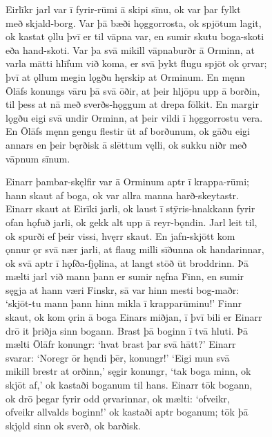 \documentclass[12pt,letterpaper]{book}
\begin{document}
\begin{linenumbers}
Eirlīkr jarl var ī fyrir-rūmi ā skipi sīnu, ok var þar fylkt\\
með skjald-borg.  Var þā bæði hǫggorrosta, ok spjōtum lagit,\\
ok kastat ǫllu þvī er til vāpna var, en sumir skutu boga-skoti\\
eða hand-skoti.  Var þa svā mikill vāpnaburðr ā Orminn, at\\
varla mātti hlīfum við koma, er svā þykt flugu spjōt ok ǫrvar;\\
þvī at ǫllum megin lǫgðu hęrskip at Orminum.  En męnn\\
Ōlāfs konungs vāru þā svā ōðir, at þeir hljōpu upp ā borðin,\\
til þess at nā með sverðs-hǫggum at drepa fōlkit.  En margir\\
lǫgðu eigi svā undir Orminn, at þeir vildi ī hǫggorrostu vera.\\
En Ōlāfs męnn gengu flestir ūt af borðunum, ok gāðu eigi\\
annars en þeir bęrðisk ā slēttum vęlli, ok sukku niðr með\\
vāpnum sīnum.

Einarr þambar-skęlfir var ā Orminum aptr ī krappa-rūmi;\\
hann skaut af boga, ok var allra manna harð-skeytastr.\\
Einarr skaut at Eirīki jarli, ok laust ī stȳris-hnakkann fyrir\\
ofan hǫfuð jarli, ok gekk alt upp ā reyr-bǫndin.  Jarl leit til,\\
ok spurði ef þeir vissi, hvęrr skaut.  En jafn-skjōtt kom\\
ǫnnur ǫr svā nær jarli, at flaug milli sīðunna ok handarinnar,\\
ok svā aptr ī hǫfða-fjǫlina, at langt stōð ūt broddrinn.  Þā\\
mælti jarl við mann þann er sumir nęfna Finn, en sumir\\
sęgja at hann væri Finskr, sā var hinn mesti bog-maðr:\\
`skjōt-tu mann þann hinn mikla ī krapparūminu!'  Finnr\\
skaut, ok kom ǫrin ā boga Einars miðjan, ī þvī bili er Einarr\\
drō it þriðja sinn bogann.  Brast þā boginn ī tvā hluti.  Þā\\
mælti Ōlāfr konungr: `hvat brast þar svā hātt?'  Einarr\\
svarar: `Noregr ōr hęndi þēr, konungr!'  `Eigi mun svā\\
mikill brestr at orðinn,' sęgir konungr, `tak boga minn, ok\\
skjōt af,' ok kastaði boganum til hans.  Einarr tōk bogann,\\
ok drō þegar fyrir odd ǫrvarinnar, ok mælti: `ofveikr,\\
ofveikr allvalds boginn!' ok kastaði aptr boganum; tōk þā\\
skjǫld sinn ok sverð, ok barðisk.


\end{linenumbers}
\end{document}
